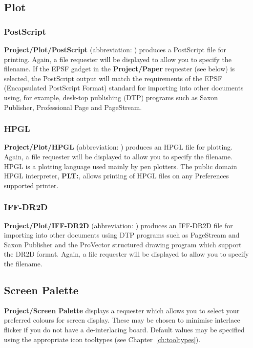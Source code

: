\subsection{Plot}
\subsubsection{PostScript}
{\bf Project/Plot/PostScript} (abbreviation: ) 
produces a PostScript file for printing. Again, a file requester will 
be displayed to allow you to specify the filename. If the EPSF
gadget in the {\bf Project/Paper} requester (see below) is selected, 
the PostScript output will 
match the requirements of the EPSF (Encapsulated PostScript Format)
standard for importing into other documents using, for example, 
desk-top publishing (DTP) programs such as Saxon Publisher, Professional 
Page and PageStream.
\subsubsection{HPGL}
{\bf Project/Plot/HPGL} (abbreviation: ) 
produces an HPGL file for plotting. Again, a file requester will 
be displayed to allow you to specify the filename. HPGL is a plotting language used 
mainly by pen plotters. The public domain HPGL interpreter, {\bf PLT:}, allows 
printing of HPGL files on any Preferences supported printer.
\subsubsection{IFF-DR2D}
{\bf Project/Plot/IFF-DR2D} (abbreviation: ) 
produces an IFF-DR2D file for importing into other documents using DTP programs 
such as PageStream and Saxon Publisher and the ProVector structured drawing program
which support the DR2D format.
Again, a file requester will be displayed to allow you to specify the filename. 


\subsection{Screen Palette}
{\bf Project/Screen Palette} displays a requester which 
allows you to select 
your preferred colours for screen display. These may be chosen to minimise 
interlace flicker if you do not have a de-interlacing board. Default values may be 
specified using the appropriate icon tooltypes (see Chapter~\ref{ch:tooltypes}).

